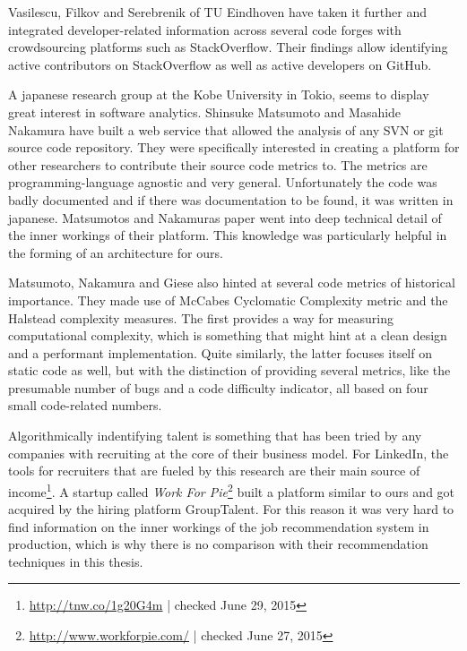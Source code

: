 Vasilescu, Filkov and Serebrenik of TU Eindhoven have taken it further
and integrated developer-related information across several code forges
with crowdsourcing platforms such as StackOverflow\cite{vfs:2012}.
Their findings allow identifying active contributors on StackOverflow
as well as active developers on GitHub.
\newline

A japanese research group at the Kobe University in Tokio, seems
to display great interest in software analytics\cite{mn:2011}. Shinsuke Matsumoto and Masahide Nakamura
have built a web service that allowed the analysis of any SVN or git source code repository.
They were specifically interested in creating a platform for other researchers to
contribute their source code metrics to. The metrics are programming-language agnostic
and very general. Unfortunately the code was badly documented and if there was documentation
to be found, it was written in japanese. Matsumotos and Nakamuras paper
went into deep technical detail of the inner workings of their platform.
This knowledge was particularly helpful in the forming of an architecture for ours.

Matsumoto, Nakamura and Giese also hinted at several code metrics of historical
importance. They made use of McCabes Cyclomatic Complexity metric\cite{mc:1976}
and the Halstead complexity measures\cite{h:1977}.
The first provides a way for measuring computational complexity, which is
something that might hint at a clean design and a performant implementation.
Quite similarly, the latter focuses itself on static code as well, but with the
distinction of providing several metrics, like the presumable number of bugs and
a code difficulty indicator, all based on four small code-related numbers.
\newline

Algorithmically indentifying talent is something that has been tried by  any companies with recruiting at the core of their business model. For LinkedIn, the tools for recruiters that are fueled by this research are their main source of income\footnote{\url{http://tnw.co/1g20G4m} | checked June 29, 2015}. A startup called \textit{Work For Pie}\footnote{\url{http://www.workforpie.com/} | checked June 27, 2015} built a platform similar to ours and got acquired by the hiring platform GroupTalent. For this reason it was very hard to find information on the inner workings of the job recommendation system in production, which is why there is no comparison with their recommendation techniques in this thesis.

